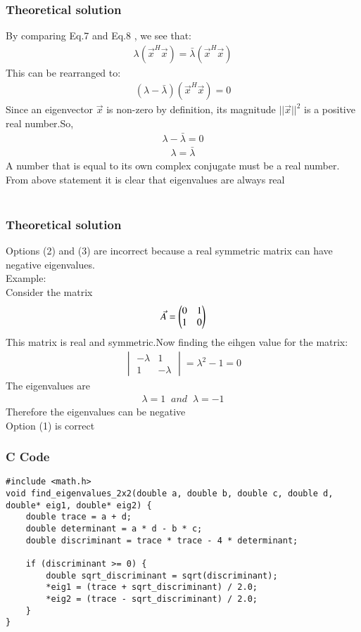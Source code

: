 \documentclass{beamer}
\begin{document}
     \begin{frame}
    \frametitle{Theoretical solution}
By comparing Eq.7 and Eq.8 , we see that:
\begin{align}
 \lambda(\Vec{x}^H\Vec{x}) = \bar{\lambda}(\Vec{x}^H\Vec{x})
\end{align}
This can be rearranged to:
\begin{align}
 (\lambda - \bar{\lambda})(\Vec{x}^H\Vec{x}) = 0
\end{align}
 Since an eigenvector $\Vec{x}$ is non-zero by definition, its magnitude $||\Vec{x}||^2$ is a positive real number.So,
 \begin{align}
     \lambda - \bar{\lambda} = 0 
 \end{align}
 \begin{align}
     \lambda = \bar{\lambda}
 \end{align}
A number that is equal to its own complex conjugate must be a real number.\\
From above statement it is clear that eigenvalues are always real\\\\

    \end{frame}

     \begin{frame}
    \frametitle{Theoretical solution}
Options (2) and (3) are incorrect because a real symmetric matrix can have negative eigenvalues.\\
Example:\\
Consider the matrix 
\begin{align}
    \Vec{A} = \begin{pmatrix}0 & 1 \\ 1 & 0\end{pmatrix}
\end{align}
This matrix is real and symmetric.Now finding the eihgen value for the matrix:
\begin{align}
    \begin{vmatrix} -\lambda & 1 \\ 1 & -\lambda \end{vmatrix} = \lambda^2 - 1 = 0
\end{align}
The eigenvalues are
\begin{align}
    \lambda = 1\;\;and\;\;\lambda = -1
\end{align}
Therefore the eigenvalues can be negative\\
Option (1) is correct
    \end{frame}

      \begin{frame}[fragile]
        \frametitle{C Code}
        \begin{lstlisting}
#include <math.h>
void find_eigenvalues_2x2(double a, double b, double c, double d, double* eig1, double* eig2) {
    double trace = a + d;
    double determinant = a * d - b * c;
    double discriminant = trace * trace - 4 * determinant;
    
    if (discriminant >= 0) {
        double sqrt_discriminant = sqrt(discriminant);
        *eig1 = (trace + sqrt_discriminant) / 2.0;
        *eig2 = (trace - sqrt_discriminant) / 2.0;
    }
}
        \end{lstlisting}
    \end{frame}
    
\end{document}
